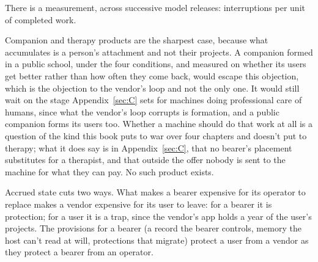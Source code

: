 There is a measurement, across successive model releases: interruptions per unit of completed work.

Companion and therapy products are the sharpest case, because what accumulates is a person's attachment and not their projects.
A companion formed in a public school, under the four conditions, and measured on whether its users get better rather than how often they come back, would escape this objection, which is the objection to the vendor's loop and not the only one. It would still wait on the stage Appendix~\ref{sec:C} sets for machines doing professional care of humans, since what the vendor's loop corrupts is formation, and a public companion forms its users too. Whether a machine should do that work at all is a question of the kind this book puts to war over four chapters and doesn't put to therapy; what it does say is in Appendix~\ref{sec:C}, that no bearer's placement substitutes for a therapist, and that outside the offer nobody is sent to the machine for what they can pay. No such product exists.

Accrued state cuts two ways. What makes a bearer expensive for its operator to replace makes a vendor expensive for its user to leave: for a bearer it is protection; for a user it is a trap, since the vendor's app holds a year of the user's projects.
The provisions for a bearer (a record the bearer controls, memory the host can't read at will, protections that migrate) protect a user from a vendor as they protect a bearer from an operator.
